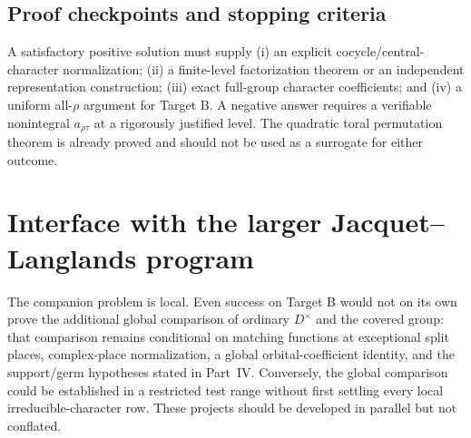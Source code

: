 \documentclass[11pt]{article}
\theoremstyle{plain}
\theoremstyle{definition}
\begin{document}
\subsection{Proof checkpoints and stopping criteria}
A satisfactory positive solution must supply (i) an explicit
cocycle/central-character normalization; (ii) a finite-level
factorization theorem or an independent representation
construction; (iii) exact full-group character coefficients;
and (iv) a uniform all-$\rho$ argument for Target B.
A negative answer requires a verifiable nonintegral
$a_{\rho\tau}$ at a rigorously justified level.
The quadratic toral permutation theorem is already proved and
should not be used as a surrogate for either outcome.

\section{Interface with the larger Jacquet--Langlands program}
The companion problem is local.  Even success on Target B would
not on its own prove the additional global comparison of ordinary
$D^\times$ and the covered group: that comparison remains
conditional on matching functions at exceptional split places,
complex-place normalization, a global orbital-coefficient
identity, and the support/germ hypotheses stated in Part~IV.
Conversely, the global comparison could be established in a
restricted test range without first settling every local
irreducible-character row.  These projects should be developed
in parallel but not conflated.
\end{document}

